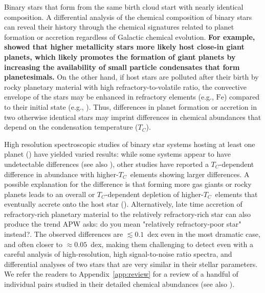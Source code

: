\documentclass[modern, letterpaper]{aastex61}
\newcommand*\elem[1]{\ensuremath{\mathrm{#1}}}
\newcommand{\Tcondens}{\ensuremath{T_C}}
\newcommand{\apw}[1]{{\color{purple}APW asks: #1}}
\newcommand*{\askjmb}[1]{{\bf #1}}
\begin{document}
Binary stars that form from the same birth cloud start with nearly identical
composition.
A differential analysis of the chemical composition of binary stars can reveal
their history through the chemical signatures related to planet formation or
accretion regardless of Galactic chemical evolution.
\askjmb{
For example, \citealt{Fischer:2005aa} showed that higher metallicity
stars more likely host close-in giant planets, which likely promotes
the formation of giant planets by increasing the availability of small particle
condensates that form planetesimals.
}
On the other hand, if host stars are polluted after their birth by rocky
planetary material with high refractory-to-volatile ratio, the convective
envelope of the stars may be enhanced in refractory elements (e.g., \elem{Fe})
compared to their initial state (e.g., \citealt{Pinsonneault:2001aa}).
Thus, differences in planet formation or accretion in two otherwise identical
stars may imprint differences in chemical abundances that depend on the
condensation temperature (\Tcondens).

High resolution spectroscopic studies of binary star systems hosting at least
one planet (\citealt{2011ApJ...740...76R,2014ApJ...790L..25T,Teske:2013aa,
  Mack:2014aa,Liu:2014aa,Teske:2015aa,Saffe:2015aa,
  Ramirez:2015aa,Biazzo:2015aa,Mack:2016aa,Teske:2016aa,Teske:2016ab})
have yielded varied results:
while some systems appear to have undetectable differences
(see also \citealt{Desidera:2004aa,Gratton:2001aa}), other
studies have reported a \Tcondens-dependent difference in abundance
with higher-\Tcondens\ elements showing larger differences.
A possible explanation for the difference is that
forming more gas giants or rocky planets leads to
an overall or \Tcondens-dependent depletion of higher-\Tcondens\ elements that
eventually accrete onto the host star
(\citealt{Ramirez:2015aa,Biazzo:2015aa}).
Alternatively, late time accretion of refractory-rich planetary material to the
relatively refractory-rich star can also produce the trend \apw{do you mean "relatively refractory-poor star" instead?}.
The observed differences are $\lesssim 0.1$~dex even in the most dramatic case,
and often closer to $\approx 0.05$~dex, making them challenging to detect even
with a careful analysis of high-resolution, high signal-to-noise ratio spectra,
and differential analyses of two stars that are very similar in their
stellar parameters.
We refer the readers to Appendix~\ref{app:review} for a review of
a handful of individual pairs studied in their detailed chemical abundances
(see also \citealt{2016arXiv161104064M}).
\end{document}
